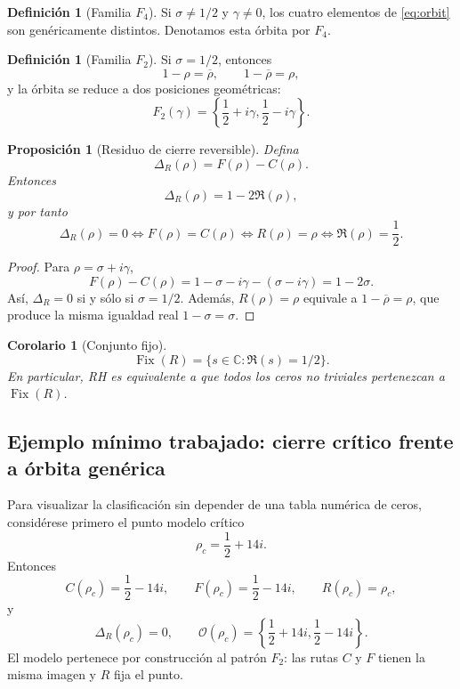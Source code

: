 \documentclass[11pt]{amsart}
\newtheorem{proposition}[theorem]{Proposición}
\newtheorem{corollary}[theorem]{Corolario}
\theoremstyle{definition}
\newtheorem{definition}[theorem]{Definición}
\theoremstyle{remark}
\begin{document}
\begin{definition}[Familia $F_4$]
Si $\sigma\neq1/2$ y $\gamma\neq0$, los cuatro elementos de \eqref{eq:orbit} son genéricamente distintos. Denotamos esta órbita por $F_4$.
\end{definition}

\begin{definition}[Familia $F_2$]
Si $\sigma=1/2$, entonces
\begin{equation}\label{eq:F2collapse}
  1-\rho=\overline\rho,\qquad 1-\overline\rho=\rho,
\end{equation}
y la órbita se reduce a dos posiciones geométricas:
\begin{equation}
 F_2(\gamma)=\left\{\frac12+i\gamma,\frac12-i\gamma\right\}.
\end{equation}
\end{definition}

\begin{proposition}[Residuo de cierre reversible]\label{prop:residual}
Defina
\begin{equation}\label{eq:delta}
 \Delta_R(\rho)=F(\rho)-C(\rho).
\end{equation}
Entonces
\begin{equation}\label{eq:deltaeval}
 \Delta_R(\rho)=1-2\Re(\rho),
\end{equation}
y por tanto
\begin{equation}\label{eq:equiv}
 \Delta_R(\rho)=0
 \iff F(\rho)=C(\rho)
 \iff R(\rho)=\rho
 \iff \Re(\rho)=\frac12.
\end{equation}
\end{proposition}

\begin{proof}
Para $\rho=\sigma+i\gamma$,
\[
F(\rho)-C(\rho)=1-\sigma-i\gamma-(\sigma-i\gamma)=1-2\sigma.
\]
Así, $\Delta_R=0$ si y sólo si $\sigma=1/2$. Además,
$R(\rho)=\rho$ equivale a $1-\overline\rho=\rho$, que produce la misma igualdad real $1-\sigma=\sigma$.
\end{proof}

\begin{corollary}[Conjunto fijo]
\begin{equation}
 \operatorname{Fix}(R)=\{s\in\mathbb C:\Re(s)=1/2\}.
\end{equation}
En particular, RH es equivalente a que todos los ceros no triviales pertenezcan a $\operatorname{Fix}(R)$.
\end{corollary}

\subsection{Ejemplo mínimo trabajado: cierre crítico frente a órbita genérica}\label{sec:workedexample}
Para visualizar la clasificación sin depender de una tabla numérica de ceros, considérese primero el punto modelo crítico
\[
\rho_c=\frac12+14i.
\]
Entonces
\[
C(\rho_c)=\frac12-14i,\qquad F(\rho_c)=\frac12-14i,\qquad R(\rho_c)=\rho_c,
\]
y
\[
\Delta_R(\rho_c)=0,
\qquad
\mathcal O(\rho_c)=\left\{\frac12+14i,\frac12-14i\right\}.
\]
El modelo pertenece por construcción al patrón $F_2$: las rutas $C$ y $F$ tienen la misma imagen y $R$ fija el punto.
\end{document}
